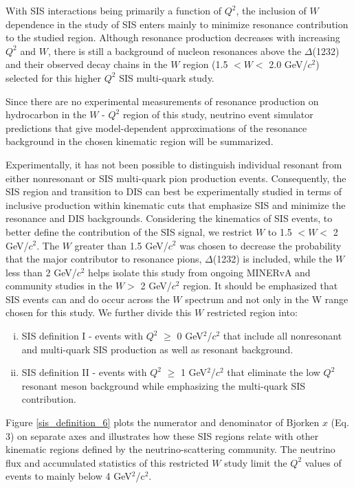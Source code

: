 \documentclass[aps, prd, twocolumn, showpacs, superscriptaddress, floatfix]{revtex4-2}
\begin{document}
With SIS interactions being primarily a function of $Q^2$, the inclusion of $W$ dependence in the study of SIS enters mainly to minimize resonance contribution to the studied region. Although resonance production decreases with increasing $Q^2$ and $W$, there is still a background of nucleon resonances above the $\Delta$(1232) and their observed decay chains in the $W$ region (1.5 $< W <$ 2.0 GeV/$c^2$) selected for this higher $Q^2$ SIS multi-quark study.  

Since there are no experimental measurements of resonance production on hydrocarbon in the $W$ - $Q^2$ region of this study, neutrino event simulator predictions that give model-dependent approximations of the resonance background in the chosen kinematic region will be summarized.

Experimentally, it has not been possible to distinguish individual resonant from either nonresonant or SIS multi-quark pion production events. Consequently, the SIS region and transition to DIS can best be experimentally studied in terms of inclusive production within kinematic cuts that emphasize SIS and minimize the resonance and DIS backgrounds. Considering the kinematics of SIS events, to better define the contribution of the SIS signal, we restrict $W$ to 1.5 $< W < $ 2 GeV/$c^2$. The $W$ greater than 1.5 GeV/$c^2$ was chosen to decrease the probability that the major contributor to resonance pions, $\Delta$(1232) \cite{MINERvA:2016sfc} is included, while the $W$ less than 2 GeV/$c^2$ helps isolate this study from ongoing MINERvA and community studies in the $W > $ 2 GeV/$c^2$ region. It should be emphasized that SIS events can and do occur across the $W$ spectrum and not only in the W range chosen for this study. We further divide this $W$ restricted region into:
\begin{enumerate}[(i)]
    \item SIS definition I - events with $Q^2$ $\geq$ 0 GeV$^2$/$c^2$ that include all nonresonant and multi-quark SIS production as well as resonant background.
    \item SIS definition II - events with $Q^2$ $\geq$ 1 GeV$^2$/$c^2$ that eliminate the low $Q^2$ resonant meson background while emphasizing the multi-quark SIS contribution. 
\end{enumerate}

Figure \ref{sis_definition_6} plots the numerator and denominator of Bjorken $x$ (Eq. 3) on separate axes and illustrates how these SIS regions relate with other kinematic regions defined by the neutrino-scattering community. The neutrino flux and accumulated statistics of this restricted $W$ study limit the $Q^2$ values of events to mainly below 4 GeV$^2$/c$^2$.
\end{document}
